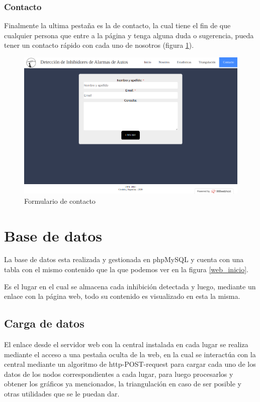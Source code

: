 \subsubsection{Contacto}
Finalmente la ultima pestaña es la de contacto, la cual tiene el fin de que cualquier persona que entre a la página y tenga alguna duda o sugerencia, 
pueda tener un contacto rápido con cada uno de nosotros (figura \ref{web_contacto}).
\begin{figure}[h!]
	\centering
	\includegraphics[scale=0.33]{images/web/contacto-web.png}
    \caption{Formulario de contacto}
	\label{web_contacto}
\end{figure}
\section{Base de datos}
La base de datos esta realizada y gestionada en phpMySQL y cuenta con una tabla con el mismo contenido que la que podemos ver en la figura \ref{web_inicio}. \par 
Es el lugar en el cual se almacena cada inhibición detectada y luego, mediante un enlace con la página web, todo su 
contenido es visualizado en esta la misma. 
\subsection{Carga de datos}
\par El enlace desde el servidor web con la central instalada en cada lugar se realiza mediante el acceso a una pestaña oculta de la web, en la cual se interactúa
 con la central mediante un algoritmo de http-POST-request para cargar cada uno de los datos de los nodos correspondientes a cada lugar, para luego procesarlos y 
obtener los gráficos ya mencionados, la triangulación en caso de ser posible y otras utilidades que se le puedan dar. 
